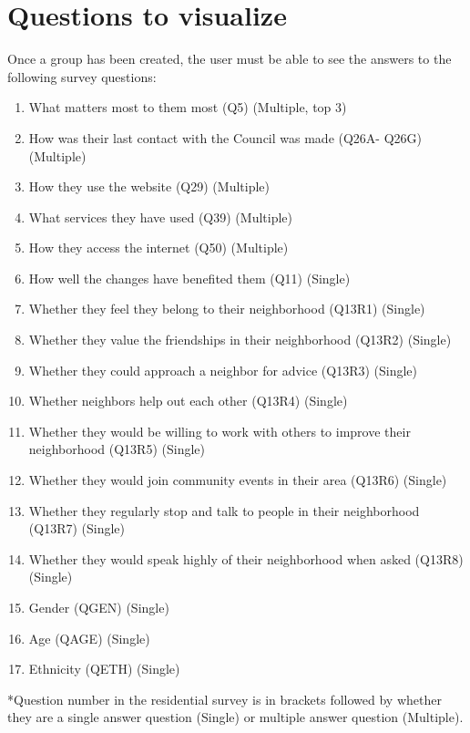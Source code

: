 \section{Questions to visualize}
Once a group has been created, the user must be able to see the answers to the following survey questions:
\begin{enumerate}
	\item What matters most to them most (Q5) (Multiple, top 3)
	\item How was their last contact with the Council was made (Q26A- Q26G) (Multiple)
	\item How they use the website (Q29)  (Multiple)
	\item What services they have used (Q39) (Multiple)
	\item How they access the internet (Q50) (Multiple)
	\item How well the changes have benefited them (Q11) (Single)
	\item Whether they feel they belong to their neighborhood (Q13\textunderscore R1) (Single)
	\item Whether they value the friendships in their neighborhood (Q13\textunderscore R2) (Single)
	\item Whether they could approach a neighbor for advice (Q13\textunderscore R3) (Single)
	\item Whether neighbors help out each other (Q13\textunderscore R4) (Single)
	\item Whether they would be willing to work with others to improve their neighborhood (Q13\textunderscore R5) (Single)
	\item Whether they would join community events in their area (Q13\textunderscore R6) (Single)
	\item Whether they regularly stop and talk to people in their neighborhood (Q13\textunderscore R7) (Single)
	\item Whether they would speak highly of their neighborhood when asked (Q13\textunderscore R8) (Single)
	\item Gender (QGEN) (Single)
	\item Age (QAGE) (Single)
	\item Ethnicity (QETH) (Single)
\end{enumerate}

*Question number in the residential survey is in brackets followed by whether they are a single answer question (Single) or multiple answer question (Multiple).\par

